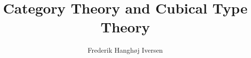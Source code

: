 \documentclass{article}
\title{Category Theory and Cubical Type Theory}
\author{Frederik Hanghøj Iversen}
\begin{document}
\maketitle




\nocite{cubical-demo}
\nocite{coquand-2013}

\begin{appendices}


\end{appendices}
\end{document}
